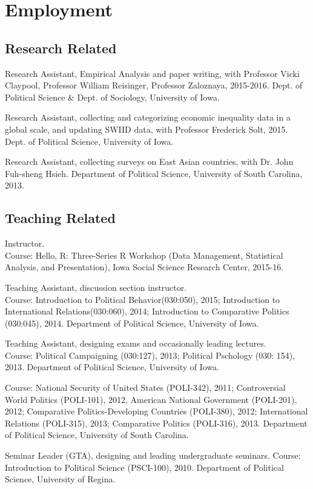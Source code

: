 \documentclass[letterpaper]{article}
\renewenvironment{itemize}{
  \begin{list}{}{
    \setlength{\leftmargin}{1.5em}
  }
}{
  \end{list}
}
\begin{document}
\section*{Employment}
\subsection*{Research Related}
\begin{itemize}
	\item Research Assistant, Empirical Analysis and paper writing, with Professor Vicki Claypool, Professor William Reisinger, Professor Zaloznaya, 2015-2016.
	Dept. of Political Science \& Dept. of Sociology, University of Iowa.
	\item Research Assistant, collecting and categorizing economic inequality data in a global scale, and updating SWIID data, with Professor Frederick Solt, 2015.
	Dept. of Political Science, University of Iowa.
	\item Research Assistant, collecting surveys on East Asian countries, with Dr. John Fuh-sheng Hsieh. Department of Political Science, University of South Carolina, 2013.
\end{itemize}

\subsection*{Teaching Related}
\begin{itemize}
\item Instructor.\\
Course: Hello, R: Three-Series R Workshop (Data Management, Statistical Analysis, and Presentation), Iowa Social Science Research Center, 2015-16.
	
\item Teaching Assistant, discussion section instructor.\\
Course: Introduction to Political Behavior(030:050),
2015; Introduction to International Relations(030:060), 2014; Introduction to Comparative Politics (030:045), 2014. Department of Political Science, University of Iowa.
\item Teaching Assistant, designing exams and occasionally leading lectures. \\
Course: Political Campaigning (030:127), 2013; Political Pschology (030: 154), 2013. Department of Political Science, University of Iowa.

Course: National Security of United States (POLI-342), 2011; Controversial World Politics (POLI-101), 2012, American National Government (POLI-201), 2012; Comparative Politics-Developing Countries (POLI-380), 2012; International Relations (POLI-315), 2013; Comparative Politics (POLI-316), 2013. Department of Political Science, University of South Carolina.
\item Seminar Leader (GTA), designing and leading undergraduate seminars. Course: Introduction to Political Science (PSCI-100), 2010. Department of Political Science, University of Regina.
\end{itemize}
\end{document}
